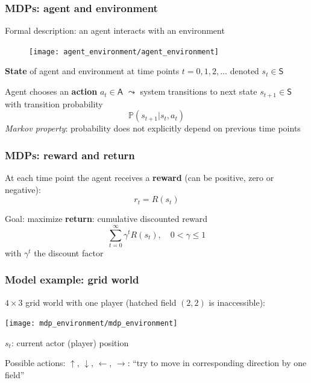 \documentclass[t]{beamer}
\begin{document}
\begin{frame}
\frametitle{MDPs: agent and environment}
Formal description: an agent interacts with an environment
\begin{figure}
\texttt{[image: agent\_environment/agent\_environment]}
\end{figure}

\textbf{State} of agent and environment at time points $t = 0, 1, 2, \dots$ denoted $s_t \in \mathsf{S}$

Agent chooses an \textbf{action} $a_t \in \mathsf{A}$ $\leadsto$ system transitions to next state $s_{t+1} \in \mathsf{S}$ with transition probability
\[
\mathbb{P}(s_{t+1} \vert s_t, a_t)
\]
\emph{Markov property}: probability does not explicitly depend on previous time points
\end{frame}



\begin{frame}
\frametitle{MDPs: reward and return}
At each time point the agent receives a \textbf{reward} (can be positive, zero or negative):
\[
r_t = R(s_t)
\]

Goal: maximize \textbf{return}: cumulative discounted reward
\[
\sum_{t=0}^\infty \gamma^t R(s_t), \quad 0 < \gamma \le 1
\]
with $\gamma^t$ the discount factor
\end{frame}



\begin{frame}
\frametitle{Model example: grid world}
$4 \times 3$ grid world with one player (hatched field $(2, 2)$ is inaccessible):
\begin{center}
\texttt{[image: mdp\_environment/mdp\_environment]}
\end{center}
\vspace{-0.5cm}
$s_t$: current actor (player) position

Possible actions: $\uparrow$, $\downarrow$, $\leftarrow$, $\rightarrow$: ``try to move in corresponding direction by one field''
\end{frame}
\end{document}
